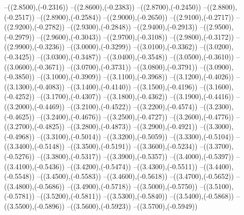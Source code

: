 {	--({\sx*(2.8500)},{\sy*(-0.2316)})
	--({\sx*(2.8600)},{\sy*(-0.2383)})
	--({\sx*(2.8700)},{\sy*(-0.2450)})
	--({\sx*(2.8800)},{\sy*(-0.2517)})
	--({\sx*(2.8900)},{\sy*(-0.2584)})
	--({\sx*(2.9000)},{\sy*(-0.2650)})
	--({\sx*(2.9100)},{\sy*(-0.2717)})
	--({\sx*(2.9200)},{\sy*(-0.2782)})
	--({\sx*(2.9300)},{\sy*(-0.2848)})
	--({\sx*(2.9400)},{\sy*(-0.2913)})
	--({\sx*(2.9500)},{\sy*(-0.2979)})
	--({\sx*(2.9600)},{\sy*(-0.3043)})
	--({\sx*(2.9700)},{\sy*(-0.3108)})
	--({\sx*(2.9800)},{\sy*(-0.3172)})
	--({\sx*(2.9900)},{\sy*(-0.3236)})
	--({\sx*(3.0000)},{\sy*(-0.3299)})
	--({\sx*(3.0100)},{\sy*(-0.3362)})
	--({\sx*(3.0200)},{\sy*(-0.3425)})
	--({\sx*(3.0300)},{\sy*(-0.3487)})
	--({\sx*(3.0400)},{\sy*(-0.3548)})
	--({\sx*(3.0500)},{\sy*(-0.3610)})
	--({\sx*(3.0600)},{\sy*(-0.3671)})
	--({\sx*(3.0700)},{\sy*(-0.3731)})
	--({\sx*(3.0800)},{\sy*(-0.3791)})
	--({\sx*(3.0900)},{\sy*(-0.3850)})
	--({\sx*(3.1000)},{\sy*(-0.3909)})
	--({\sx*(3.1100)},{\sy*(-0.3968)})
	--({\sx*(3.1200)},{\sy*(-0.4026)})
	--({\sx*(3.1300)},{\sy*(-0.4083)})
	--({\sx*(3.1400)},{\sy*(-0.4140)})
	--({\sx*(3.1500)},{\sy*(-0.4196)})
	--({\sx*(3.1600)},{\sy*(-0.4252)})
	--({\sx*(3.1700)},{\sy*(-0.4307)})
	--({\sx*(3.1800)},{\sy*(-0.4362)})
	--({\sx*(3.1900)},{\sy*(-0.4416)})
	--({\sx*(3.2000)},{\sy*(-0.4469)})
	--({\sx*(3.2100)},{\sy*(-0.4522)})
	--({\sx*(3.2200)},{\sy*(-0.4574)})
	--({\sx*(3.2300)},{\sy*(-0.4625)})
	--({\sx*(3.2400)},{\sy*(-0.4676)})
	--({\sx*(3.2500)},{\sy*(-0.4727)})
	--({\sx*(3.2600)},{\sy*(-0.4776)})
	--({\sx*(3.2700)},{\sy*(-0.4825)})
	--({\sx*(3.2800)},{\sy*(-0.4873)})
	--({\sx*(3.2900)},{\sy*(-0.4921)})
	--({\sx*(3.3000)},{\sy*(-0.4968)})
	--({\sx*(3.3100)},{\sy*(-0.5014)})
	--({\sx*(3.3200)},{\sy*(-0.5059)})
	--({\sx*(3.3300)},{\sy*(-0.5104)})
	--({\sx*(3.3400)},{\sy*(-0.5148)})
	--({\sx*(3.3500)},{\sy*(-0.5191)})
	--({\sx*(3.3600)},{\sy*(-0.5234)})
	--({\sx*(3.3700)},{\sy*(-0.5276)})
	--({\sx*(3.3800)},{\sy*(-0.5317)})
	--({\sx*(3.3900)},{\sy*(-0.5357)})
	--({\sx*(3.4000)},{\sy*(-0.5397)})
	--({\sx*(3.4100)},{\sy*(-0.5436)})
	--({\sx*(3.4200)},{\sy*(-0.5474)})
	--({\sx*(3.4300)},{\sy*(-0.5511)})
	--({\sx*(3.4400)},{\sy*(-0.5548)})
	--({\sx*(3.4500)},{\sy*(-0.5583)})
	--({\sx*(3.4600)},{\sy*(-0.5618)})
	--({\sx*(3.4700)},{\sy*(-0.5652)})
	--({\sx*(3.4800)},{\sy*(-0.5686)})
	--({\sx*(3.4900)},{\sy*(-0.5718)})
	--({\sx*(3.5000)},{\sy*(-0.5750)})
	--({\sx*(3.5100)},{\sy*(-0.5781)})
	--({\sx*(3.5200)},{\sy*(-0.5811)})
	--({\sx*(3.5300)},{\sy*(-0.5840)})
	--({\sx*(3.5400)},{\sy*(-0.5868)})
	--({\sx*(3.5500)},{\sy*(-0.5896)})
	--({\sx*(3.5600)},{\sy*(-0.5923)})
	--({\sx*(3.5700)},{\sy*(-0.5949)})
}
